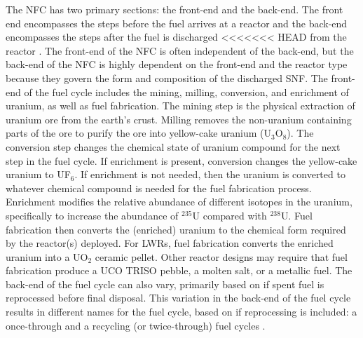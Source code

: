 The \acrfull{NFC} has two primary sections: the front-end and 
the back-end. 
The front end encompasses the steps before the fuel arrives at a reactor 
and the back-end encompasses the steps after the fuel is discharged 
<<<<<<< HEAD
from the reactor \cite{rodriguez-penalonga_review_2017}. The front-end of 
the \gls{NFC} is often independent of the back-end, but the back-end 
of the \gls{NFC} is highly dependent on the front-end and the reactor 
type because they govern the form and composition of the discharged 
\acrfull{SNF}. The front-end of the fuel cycle includes the mining, 
milling, conversion, and enrichment of uranium, as well as 
fuel fabrication. The mining step is the physical extraction of uranium 
ore from the earth's crust. Milling removes the non-uranium containing 
parts of the ore to purify the ore into yellow-cake uranium (U$_3$O$_8$).
The conversion step changes the chemical state of uranium compound 
for the next step in the fuel cycle. If enrichment is present, conversion 
changes the yellow-cake uranium to UF$_6$. If enrichment is not 
needed, then the uranium is converted to whatever chemical compound is 
needed for the fuel fabrication process. Enrichment modifies the 
relative abundance of different isotopes in the uranium, specifically 
to increase the abundance of $^{235}$U compared with $^{238}$U. Fuel 
fabrication then converts the (enriched) uranium to the chemical 
form required by the reactor(s) deployed. For \glspl{LWR}, fuel 
fabrication converts the enriched uranium into a UO$_2$ ceramic 
pellet. Other reactor designs may require that fuel fabrication 
produce a UCO \gls{TRISO} pebble, a molten salt, or a metallic fuel. 
The back-end of the fuel cycle can also vary, primarily based on if spent 
fuel is reprocessed before final disposal. This variation in the 
back-end of the fuel cycle results in different names for the fuel 
cycle, based on if reprocessing is included: a once-through and a recycling 
(or twice-through) fuel cycles \cite{tsoulfanidis_nuclear_2013}. 

